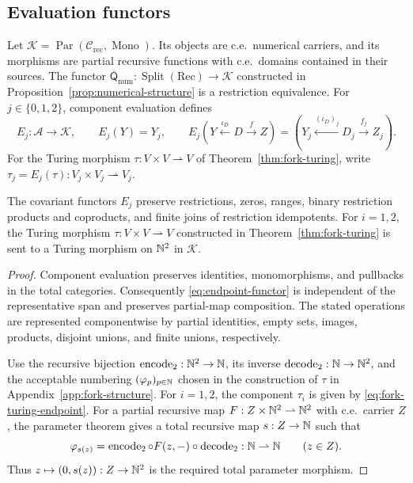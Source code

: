 \subsection{Evaluation functors}

Let
$\mathcal K=\operatorname{Par}(\mathcal C_{\mathrm{rec}},\operatorname{Mono})$.
Its objects are c.e.\ numerical carriers, and its morphisms are partial
recursive functions with c.e.\ domains contained in their sources.
The functor
$\mathsf Q_{\mathrm{num}}:\operatorname{Split}(\mathrm{Rec})\to\mathcal K$
constructed in Proposition~\ref{prop:numerical-structure} is a
restriction equivalence.
For $j\in\{0,1,2\}$, component evaluation defines
\begin{equation}\label{eq:endpoint-functor}
 E_j:\mathcal A\longrightarrow\mathcal K,\qquad
 E_j(Y)=Y_j,\qquad
 E_j(Y\xleftarrow{\iota_D}D\xrightarrow{f}Z)
   =(Y_j\xleftarrow{(\iota_D)_j}D_j\xrightarrow{f_j}Z_j).
\end{equation}
For the Turing morphism $\tau:V\times V\rightharpoonup V$ of
Theorem~\ref{thm:fork-turing}, write
$\tau_j=E_j(\tau):V_j\times V_j\rightharpoonup V_j$.

\begin{proposition}\label{prop:endpoint}
The covariant functors $E_j$ preserve restrictions, zeros, ranges,
binary restriction products and coproducts, and finite joins of
restriction idempotents.
For $i=1,2$, the Turing morphism
$\tau:V\times V\rightharpoonup V$ constructed in
Theorem~\ref{thm:fork-turing} is sent
to a Turing morphism on $\mathbb N^2$ in $\mathcal K$.
\end{proposition}
\begin{proof}
Component evaluation preserves identities, monomorphisms, and
pullbacks in the total categories. Consequently \eqref{eq:endpoint-functor}
is independent of the representative span and preserves partial-map
composition. The stated operations are represented componentwise by
partial identities, empty sets, images, products, disjoint unions, and
finite unions, respectively.

Use the recursive bijection $\operatorname{encode}_2:\mathbb N^2\to\mathbb N$,
its inverse $\operatorname{decode}_2:\mathbb N\to\mathbb N^2$, and the acceptable numbering
$(\varphi_p)_{p\in\mathbb N}$ chosen in the construction of $\tau$ in
Appendix~\ref{app:fork-structure}. For $i=1,2$, the component $\tau_i$ is given by
\eqref{eq:fork-turing-endpoint}.
For a partial recursive map
$F:Z\times\mathbb N^2\rightharpoonup\mathbb N^2$ with c.e.\ carrier $Z$,
the parameter theorem gives a total recursive map $s:Z\to\mathbb N$ such that
\[
 \varphi_{s(z)}
 =\operatorname{encode}_2\circ F(z,-)\circ\operatorname{decode}_2
 :\mathbb N\rightharpoonup\mathbb N
 \qquad(z\in Z).
\]
Thus $z\mapsto(0,s(z)):Z\to\mathbb N^2$ is the required total parameter morphism.
\end{proof}

